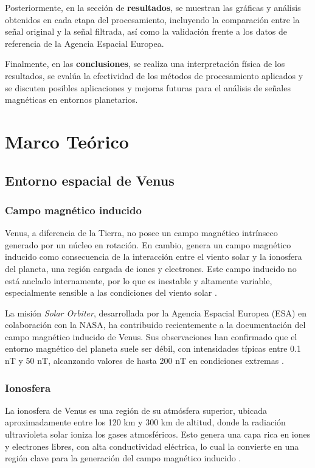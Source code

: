 \documentclass[letterpaper,11pt]{article}
\begin{document}
            Posteriormente, en la sección de \textbf{resultados}, se muestran las gráficas y análisis obtenidos en cada etapa del procesamiento, incluyendo la comparación entre la señal original y la señal filtrada, así como la validación frente a los datos de referencia de la Agencia Espacial Europea.

            Finalmente, en las \textbf{conclusiones}, se realiza una interpretación física de los resultados, se evalúa la efectividad de los métodos de procesamiento aplicados y se discuten posibles aplicaciones y mejoras futuras para el análisis de señales magnéticas en entornos planetarios.
\newpage
    \section{Marco Teórico}
        \subsection{Entorno espacial de Venus}
            \subsubsection{Campo magnético inducido}
                Venus, a diferencia de la Tierra, no posee un campo magnético intrínseco generado por un núcleo en rotación. En cambio, genera un campo magnético inducido como consecuencia de la interacción entre el viento solar y la ionosfera del planeta, una región cargada de iones y electrones. Este campo inducido no está anclado internamente, por lo que es inestable y altamente variable, especialmente sensible a las condiciones del viento solar \cite{nasa2025}.


                La misión \textit{Solar Orbiter}, desarrollada por la Agencia Espacial Europea (ESA) en colaboración con la NASA, ha contribuido recientemente a la documentación del campo magnético inducido de Venus. Sus observaciones han confirmado que el entorno magnético del planeta suele ser débil, con intensidades típicas entre 0.1 nT y 50 nT, alcanzando valores de hasta 200 nT en condiciones extremas \cite{solarorbiter2021}.

            \subsubsection{Ionosfera}

                La ionosfera de Venus es una región de su atmósfera superior, ubicada aproximadamente entre los 120 km y 300 km de altitud, donde la radiación ultravioleta solar ioniza los gases atmosféricos. Esto genera una capa rica en iones y electrones libres, con alta conductividad eléctrica, lo cual la convierte en una región clave para la generación del campo magnético inducido \cite{patzold2007}.
\end{document}
